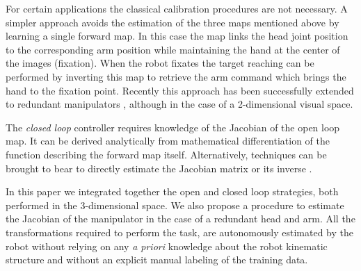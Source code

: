 For certain applications the classical calibration procedures are not 
necessary. A simpler approach \cite{blackburn94learning} avoids the estimation 
of the three maps mentioned above by learning a single forward map. 
In this case the map links the head joint position to the corresponding arm position while 
maintaining the hand at the center of the images (fixation). When the robot fixates the 
target reaching can be performed by inverting this map to retrieve the arm command which brings
the hand to the fixation point. Recently this approach has been successfully 
extended to redundant manipulators \cite{lopes06learning}, although in the 
case of a 2-dimensional visual space.

The {\em closed loop} controller requires knowledge of the Jacobian of the open loop map.
It can be derived analytically from mathematical differentiation of the function describing 
the forward map itself. 
Alternatively, techniques can be brought to bear to directly estimate the Jacobian matrix
\cite{Hosoda94versatile,Mansard06jacobian} or its inverse \cite{Lapreste04efficient}.

In this paper we integrated together the 
open \cite{blackburn94learning,Mansard06jacobian,scaz07fast} and closed 
\cite{Hosoda94versatile,lopes06learning} loop 
strategies, both performed in the 3-dimensional space.
We also propose a procedure to estimate 
the Jacobian of the manipulator in the case of a redundant head and arm. All the 
transformations required to perform the task, are autonomously estimated by the robot 
without relying on any \emph{a priori} knowledge about the robot kinematic structure and
without an explicit manual labeling of the training data.
